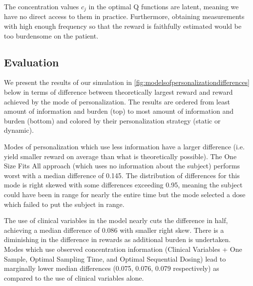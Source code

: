 The concentration values $ c_j $ in the optimal Q functions are latent, meaning we have no direct access to them in practice. Furthermore, obtaining measurements with high enough frequency so that the reward is faithfully estimated would be too burdensome on the patient. 


\subsection{Evaluation}

We present the results of our simulation in \cref{fig:modelsofpersonalizationdifferences} below in terms of difference between theoretically largest reward and reward achieved by the mode of personalization.  The results are ordered from least amount of information and burden (top) to most amount of information and burden (bottom) and colored by their personalization strategy (static or dynamic).

Modes of personalization which use less information have a larger difference (i.e. yield smaller reward on average than what is theoretically possible).  The One Size Fits All approach (which uses no information about the subject) performs worst with a median difference of 0.145.  The distribution of differences for this mode is right skewed with some differences exceeding 0.95, meaning the subject could have been in range for nearly the entire time but the mode selected a dose which failed to put the subject in range. 

The use of clinical variables in the model nearly cuts the difference in half, achieving a median difference of 0.086 with smaller right skew.  There is a diminishing in the difference in rewards as additional burden is undertaken. Modes which use observed concentration information (Clinical Variables + One Sample, Optimal Sampling Time, and Optimal Sequential Dosing) lead to marginally lower median differences  (0.075, 0.076, 0.079 respectively) as compared to the use of clinical variables alone.


